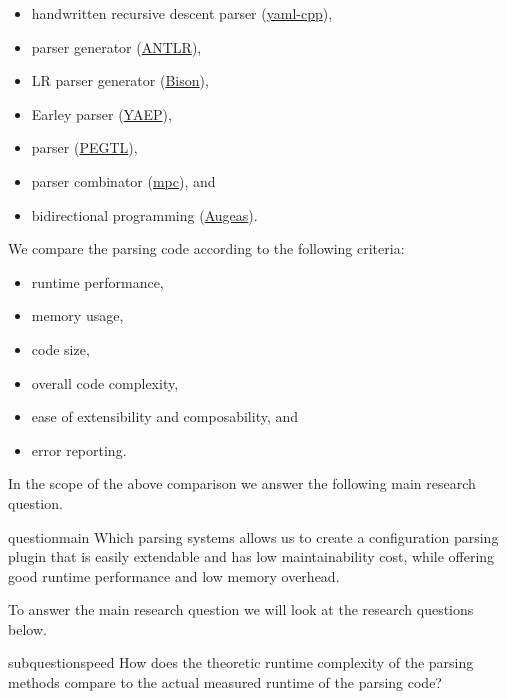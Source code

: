 \begin{itemize}
  \item handwritten recursive descent parser (\href{https://github.com/jbeder/yaml-cpp}{yaml-cpp}),
  \item {} parser generator (\href{http://www.antlr.org}{ANTLR}),
  \item LR parser generator (\href{https://www.gnu.org/software/bison}{Bison}),
  \item Earley parser (\href{https://github.com/vnmakarov/yaep}{YAEP}),
  \item {} parser (\href{https://github.com/taocpp/PEGTL}{PEGTL}),
  \item parser combinator (\href{https://github.com/orangeduck/mpc}{mpc}), and
  \item bidirectional programming (\href{http://augeas.net}{Augeas}).
\end{itemize}

We compare the parsing code according to the following criteria:

\begin{itemize}
  \item runtime performance,
  \item memory usage,
  \item code size,
  \item overall code complexity,
  \item ease of extensibility and composability, and
  \item error reporting.
\end{itemize}

In the scope of the above comparison we answer the following main research question.

\begin{restatable}{question}{main}
   Which parsing systems allows us to create a configuration parsing plugin that is easily extendable and has low maintainability cost, while offering good runtime performance and low memory overhead.
\end{restatable}

To answer the main research question we will look at the research questions below.

\begin{restatable}{subquestion}{speed}
  \label{que:speed}
  How does the theoretic runtime complexity of the parsing methods compare to the actual measured runtime of the parsing code?
\end{restatable}

